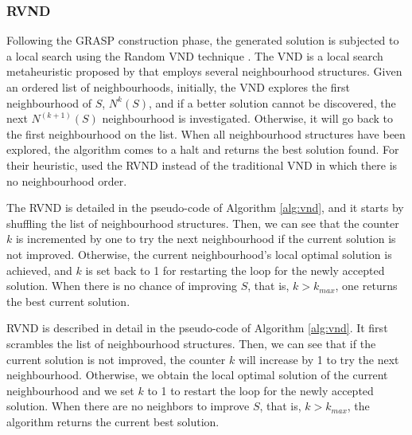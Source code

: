 \documentclass{singlecol-new}
\begin{document}
\subsubsection{RVND}
Following the GRASP construction phase, the generated solution is subjected to a local search using the Random VND technique \citep{mladenovic12}. The VND is a local search metaheuristic proposed by \citet{mladenovic97} that employs several neighbourhood structures. Given an ordered list of neighbourhoods, initially, the VND explores the first neighbourhood of $S$, $N^k(S)$, and if a better solution cannot be discovered, the next $N^{(k + 1)}(S) $  neighbourhood is investigated. Otherwise, it will go back to the first neighbourhood on the list. When all neighbourhood structures have been explored, the algorithm comes to a halt and returns the best solution found. For their heuristic, \citet{daSilva} used the RVND instead of the traditional VND in which there is no neighbourhood order.




The RVND is detailed in the pseudo-code of Algorithm \ref{alg:vnd}, and it starts by shuffling the list of neighbourhood structures. Then, we can see that the counter $k$ is incremented by one to try the next neighbourhood if the current solution is not improved.
Otherwise, the current neighbourhood's local optimal solution is achieved, and $k$ is set back to 1 for restarting the loop for the newly accepted solution.
When there is no chance of improving $S$, that is, $k > k_{max}$, one returns the best current solution.

RVND is described in detail in the pseudo-code of Algorithm \ref{alg:vnd}. It first scrambles the list of neighbourhood structures. Then, we can see that if the current solution is not improved, the counter $k$ will increase by 1 to try the next neighbourhood. Otherwise, we obtain the local optimal solution of the current neighbourhood and we set $k$ to 1 to restart the loop for the newly accepted solution. When there are no neighbors to improve $S$, that is, $k> k_{max}$, the algorithm returns the current best solution.
\end{document}
